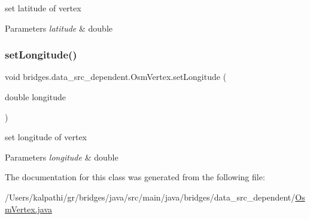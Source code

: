 set latitude of vertex 
\begin{DoxyParams}{Parameters}
{\em latitude} & double \\
\hline
\end{DoxyParams}
\mbox{\label{classbridges_1_1data__src__dependent_1_1_osm_vertex_a2b4ac472641b5b206cff7db53ce3285b}} 
\subsubsection{\texorpdfstring{setLongitude()}{setLongitude()}}
{\footnotesize\ttfamily void bridges.\+data\+\_\+src\+\_\+dependent.\+Osm\+Vertex.\+set\+Longitude (\begin{DoxyParamCaption}\item[{double}]{longitude }\end{DoxyParamCaption})}

set longitude of vertex 
\begin{DoxyParams}{Parameters}
{\em longitude} & double \\
\hline
\end{DoxyParams}


The documentation for this class was generated from the following file\+:\begin{DoxyCompactItemize}
\item 
/\+Users/kalpathi/gr/bridges/java/src/main/java/bridges/data\+\_\+src\+\_\+dependent/\mbox{\hyperlink{_osm_vertex_8java}{Osm\+Vertex.\+java}}\end{DoxyCompactItemize}
